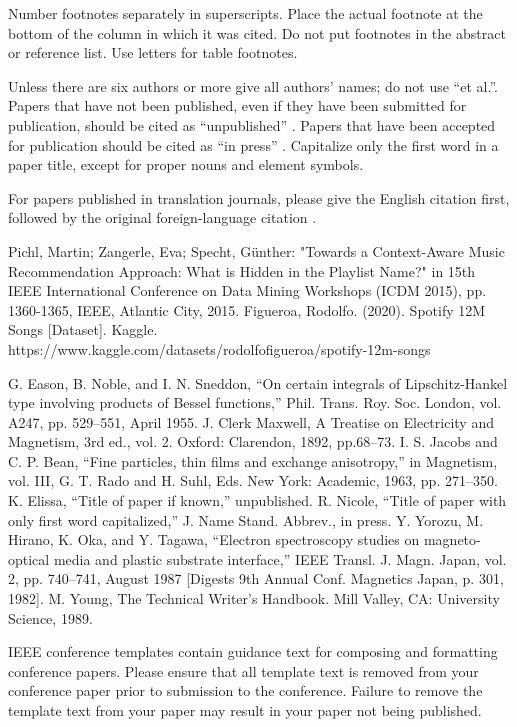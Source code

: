 \documentclass[conference]{IEEEtran}
\begin{document}
Number footnotes separately in superscripts. Place the actual footnote at 
the bottom of the column in which it was cited. Do not put footnotes in the 
abstract or reference list. Use letters for table footnotes.

Unless there are six authors or more give all authors' names; do not use 
``et al.''. Papers that have not been published, even if they have been 
submitted for publication, should be cited as ``unpublished'' \cite{b4}. Papers 
that have been accepted for publication should be cited as ``in press'' \cite{b5}. 
Capitalize only the first word in a paper title, except for proper nouns and 
element symbols.

For papers published in translation journals, please give the English 
citation first, followed by the original foreign-language citation \cite{b6}.

\begin{thebibliography}{00}
 Pichl, Martin; Zangerle, Eva; Specht, Günther: "Towards a Context-Aware Music Recommendation Approach: What is Hidden in the Playlist Name?" in 15th IEEE International Conference on Data Mining Workshops (ICDM 2015), pp. 1360-1365, IEEE, Atlantic City, 2015.
 Figueroa, Rodolfo. (2020). Spotify 12M Songs [Dataset]. Kaggle. https://www.kaggle.com/datasets/rodolfofigueroa/spotify-12m-songs

 G. Eason, B. Noble, and I. N. Sneddon, ``On certain integrals of Lipschitz-Hankel type involving products of Bessel functions,'' Phil. Trans. Roy. Soc. London, vol. A247, pp. 529--551, April 1955.
 J. Clerk Maxwell, A Treatise on Electricity and Magnetism, 3rd ed., vol. 2. Oxford: Clarendon, 1892, pp.68--73.
 I. S. Jacobs and C. P. Bean, ``Fine particles, thin films and exchange anisotropy,'' in Magnetism, vol. III, G. T. Rado and H. Suhl, Eds. New York: Academic, 1963, pp. 271--350.
 K. Elissa, ``Title of paper if known,'' unpublished.
 R. Nicole, ``Title of paper with only first word capitalized,'' J. Name Stand. Abbrev., in press.
 Y. Yorozu, M. Hirano, K. Oka, and Y. Tagawa, ``Electron spectroscopy studies on magneto-optical media and plastic substrate interface,'' IEEE Transl. J. Magn. Japan, vol. 2, pp. 740--741, August 1987 [Digests 9th Annual Conf. Magnetics Japan, p. 301, 1982].
 M. Young, The Technical Writer's Handbook. Mill Valley, CA: University Science, 1989.
\end{thebibliography}
\vspace{12pt}
\color{red}
IEEE conference templates contain guidance text for composing and formatting conference papers. Please ensure that all template text is removed from your conference paper prior to submission to the conference. Failure to remove the template text from your paper may result in your paper not being published.
\end{document}
